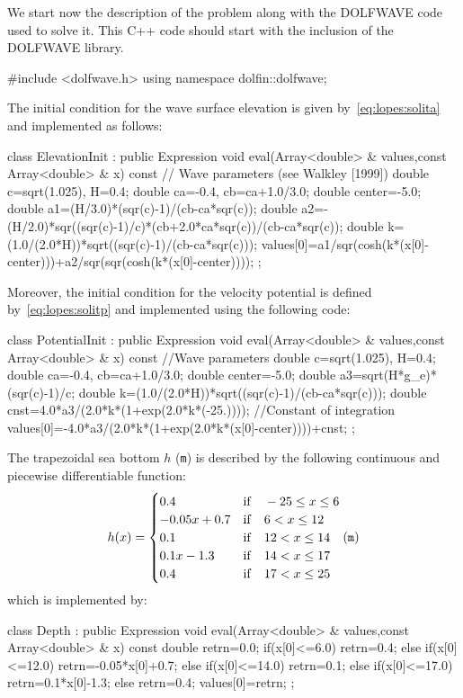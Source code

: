 We start now  the description of the problem along with the DOLFWAVE code used to
solve it. This C++ code should start with the inclusion of
the DOLFWAVE library.
\begin{c++}
#include <dolfwave.h>
using namespace dolfin::dolfwave;
\end{c++}
The initial condition for the wave surface elevation is
given by~\eqref{eq:lopes:solita} and implemented as follows:
\begin{c++}
class ElevationInit : public Expression
{
  void eval(Array<double> & values,const Array<double> & x) const
  { // Wave parameters (see Walkley [1999])
    double c=sqrt(1.025), H=0.4;
    double ca=-0.4, cb=ca+1.0/3.0;
    double center=-5.0;
    double a1=(H/3.0)*(sqr(c)-1)/(cb-ca*sqr(c));
    double a2=-(H/2.0)*sqr((sqr(c)-1)/c)*(cb+2.0*ca*sqr(c))/(cb-ca*sqr(c));
    double k=(1.0/(2.0*H))*sqrt((sqr(c)-1)/(cb-ca*sqr(c)));
    values[0]=a1/sqr(cosh(k*(x[0]-center)))+a2/sqr(sqr(cosh(k*(x[0]-center))));
  }
};
\end{c++}
Moreover, the initial condition for the velocity potential
is defined by~\eqref{eq:lopes:solitp} and implemented using
the following code:
\begin{c++}
class PotentialInit :  public Expression
{
  void eval(Array<double> & values,const Array<double> & x) const
  { //Wave parameters
    double c=sqrt(1.025), H=0.4;
    double ca=-0.4, cb=ca+1.0/3.0;
    double center=-5.0;
    double a3=sqrt(H*g_e)*(sqr(c)-1)/c;
    double k=(1.0/(2.0*H))*sqrt((sqr(c)-1)/(cb-ca*sqr(c)));
    double cnst=4.0*a3/(2.0*k*(1+exp(2.0*k*(-25.)))); //Constant of integration
    values[0]=-4.0*a3/(2.0*k*(1+exp(2.0*k*(x[0]-center))))+cnst;
  }
};
\end{c++}
The trapezoidal sea bottom $h$ ({\tt m})  is described by the following
continuous and piecewise differentiable function:
\begin{equation}\label{eq:lopes:piecewisebottom}
h(x)=\begin{cases}
0.4& {\rm if}\quad -25 \leq x\leq 6\\
-0.05x+0.7& {\rm if}\quad 6< x\leq 12\\
0.1& {\rm if}\quad 12< x\leq 14\\
0.1x-1.3& {\rm if}\quad 14< x\leq 17\\
0.4& {\rm if}\quad 17< x\leq 25
\end{cases}  ({\tt m})
\end{equation}
which is implemented by:
\begin{c++}
class Depth :  public Expression
{
  void eval(Array<double> & values,const Array<double> & x) const
  {
    double retrn=0.0;
    if(x[0]<=6.0)
      retrn=0.4;
    else if(x[0]<=12.0)
      retrn=-0.05*x[0]+0.7;
    else if(x[0]<=14.0)
      retrn=0.1;
    else if(x[0]<=17.0)
      retrn=0.1*x[0]-1.3;
    else retrn=0.4;
    values[0]=retrn;
  }
};
\end{c++}
